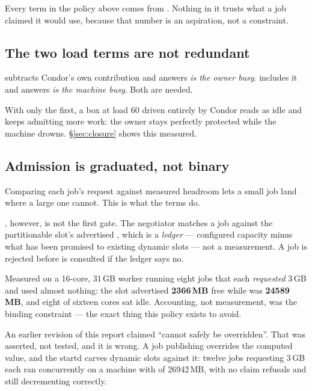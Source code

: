 Every term in the policy above comes from . Nothing in it trusts what
a job claimed it would use, because that number is an aspiration, not a
constraint.

\subsection{The two load terms are not redundant}

 subtracts Condor's own contribution and answers \emph{is the
owner busy}.  includes it and answers \emph{is the machine
busy}. Both are needed.

With only the first, a box at load 60 driven entirely by Condor reads as idle
and keeps admitting more work: the owner stays perfectly protected while the
machine drowns. \S\ref{sec:closure} shows this measured.

\subsection{Admission is graduated, not binary}

Comparing each job's request against measured headroom lets a small job land
where a large one cannot. This is what the  terms do.

, however, is not the first gate. The negotiator matches a job
against the partitionable slot's advertised , which is a
\emph{ledger} --- configured capacity minus what has been promised to existing
dynamic slots --- not a measurement. A job is rejected before  is
consulted if the ledger says no.

\begin{trap}
Measured on a 16-core, 31\,GB worker running eight jobs that each
\emph{requested} 3\,GB and used almost nothing: the slot advertised
\textbf{2366\,MB} free while  was \textbf{24589\,MB}, and
eight of sixteen cores sat idle. Accounting, not measurement, was the binding
constraint --- the exact thing this policy exists to avoid.
\end{trap}

An earlier revision of this report claimed  ``cannot safely be
overridden''. That was asserted, not tested, and it is wrong. A
 job publishing  overrides the computed value, and
the startd carves dynamic slots against it: twelve jobs requesting 3\,GB each
ran concurrently on a machine with  of 26942\,MB, with no
claim refusals and  still decrementing correctly.

